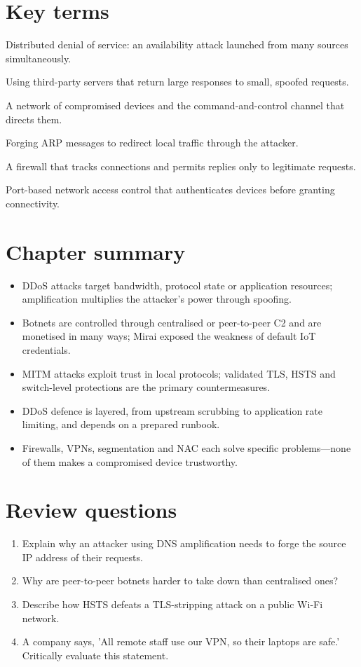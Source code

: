 \section*{Key terms}
\begin{description}[style=nextline,leftmargin=1.2em]
  \item[DDoS] Distributed denial of service: an availability attack launched from many sources simultaneously.
  \item[Amplification] Using third-party servers that return large responses to small, spoofed requests.
  \item[Botnet / C2] A network of compromised devices and the command-and-control channel that directs them.
  \item[ARP spoofing] Forging ARP messages to redirect local traffic through the attacker.
  \item[Stateful firewall] A firewall that tracks connections and permits replies only to legitimate requests.
  \item[802.1X] Port-based network access control that authenticates devices before granting connectivity.
\end{description}

\section*{Chapter summary}
\begin{itemize}
  \item DDoS attacks target bandwidth, protocol state or application resources; amplification multiplies the attacker's power through spoofing.
  \item Botnets are controlled through centralised or peer-to-peer C2 and are monetised in many ways; Mirai exposed the weakness of default IoT credentials.
  \item MITM attacks exploit trust in local protocols; validated TLS, HSTS and switch-level protections are the primary countermeasures.
  \item DDoS defence is layered, from upstream scrubbing to application rate limiting, and depends on a prepared runbook.
  \item Firewalls, VPNs, segmentation and NAC each solve specific problems—none of them makes a compromised device trustworthy.
\end{itemize}

\section*{Review questions}
\begin{enumerate}
  \item Explain why an attacker using DNS amplification needs to forge the source IP address of their requests.
  \item Why are peer-to-peer botnets harder to take down than centralised ones?
  \item Describe how HSTS defeats a TLS-stripping attack on a public Wi-Fi network.
  \item A company says, 'All remote staff use our VPN, so their laptops are safe.' Critically evaluate this statement.
\end{enumerate}

